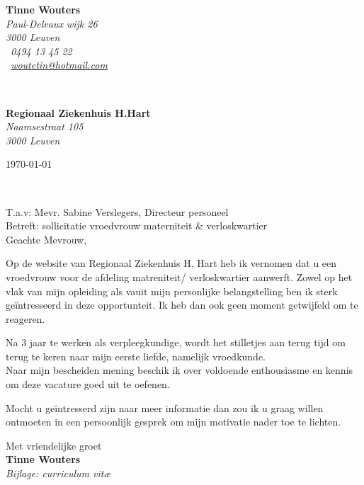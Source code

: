 \documentclass[11pt]{article}
\begin{document}
\sffamily   %
\hfill%
\begin{minipage}[t]{.6\textwidth}
\raggedleft%
{\bfseries Tinne Wouters}\\[.35ex]
\small\itshape%
Paul-Delvaux wijk 26\\
3000 Leuven\\[.35ex]
\Telefon~0494 13 45 22\\
\Letter~\href{mailto:woutetin@hotmail.com} {woutetin@hotmail.com}
\end{minipage}\\[1em]
%
\begin{minipage}[t]{.4\textwidth}
\raggedright%
{\bfseries Regionaal Ziekenhuis H.Hart}\\[.35ex]
\small\itshape%
Naamsestraat 105\\
3000 Leuven
\end{minipage}
\hfill %
\begin{minipage}[t]{.4\textwidth}
\raggedleft %
\today
\end{minipage}\\[2em]
\raggedright
T.a.v: Mevr. Sabine Verslegers, Directeur personeel\\[1.5em]

Betreft: sollicitatie vroedvrouw materniteit \& verloskwartier\\[1.5em]
%

Geachte Mevrouw,

Op de website van Regionaal Ziekenhuis H. Hart heb ik vernomen dat u een vroedvrouw voor de afdeling matreniteit/ verloskwartier aanwerft. 
Zowel op het vlak van mijn opleiding als vauit mijn personlijke belangstelling ben ik sterk geïntresseerd in deze opportunteit. 
Ik heb dan ook geen moment getwijfeld om te reageren.\newline

Na 3 jaar te werken als verpleegkundige, wordt het stilletjes aan terug tijd om terug te keren naar mijn eerste liefde, namelijk vroedkunde.  \\
Naar mijn bescheiden mening beschik ik over voldoende enthousiasme en kennis om deze vacature goed uit te oefenen.\newline

Mocht u geïntresserd zijn naar  meer informatie dan zou ik u graag willen ontmoeten in een persoonlijk gesprek om mijn motivatie nader toe te lichten.

Met vriendelijke groet\\
[2em] %
%
{\bfseries Tinne Wouters}\\
\vfill%
{\slshape Bijlage: curriculum vit\ae{}}
\end{document}

